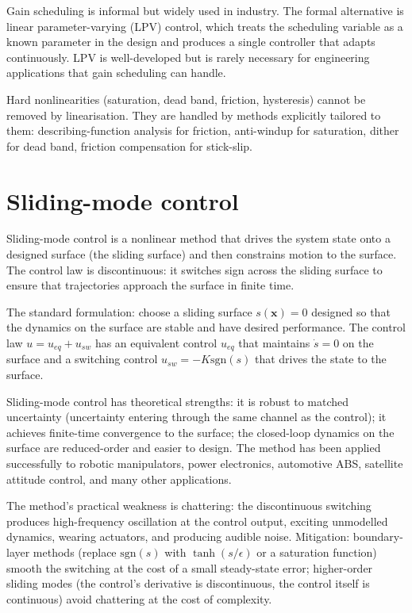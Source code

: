 Gain scheduling is informal but widely used in industry. The formal alternative is linear parameter-varying (LPV) control, which treats the scheduling variable as a known parameter in the design and produces a single controller that adapts continuously. LPV is well-developed but is rarely necessary for engineering applications that gain scheduling can handle.

Hard nonlinearities (saturation, dead band, friction, hysteresis) cannot be removed by linearisation. They are handled by methods explicitly tailored to them: describing-function analysis for friction, anti-windup for saturation, dither for dead band, friction compensation for stick-slip.

\section{Sliding-mode control}

Sliding-mode control is a nonlinear method that drives the system state onto a designed surface (the sliding surface) and then constrains motion to the surface. The control law is discontinuous: it switches sign across the sliding surface to ensure that trajectories approach the surface in finite time.

The standard formulation: choose a sliding surface $s(\mathbf{x}) = 0$ designed so that the dynamics on the surface are stable and have desired performance. The control law $u = u_{eq} + u_{sw}$ has an equivalent control $u_{eq}$ that maintains $\dot{s} = 0$ on the surface and a switching control $u_{sw} = -K \text{sgn}(s)$ that drives the state to the surface.

Sliding-mode control has theoretical strengths: it is robust to matched uncertainty (uncertainty entering through the same channel as the control); it achieves finite-time convergence to the surface; the closed-loop dynamics on the surface are reduced-order and easier to design. The method has been applied successfully to robotic manipulators, power electronics, automotive ABS, satellite attitude control, and many other applications.

The method's practical weakness is chattering: the discontinuous switching produces high-frequency oscillation at the control output, exciting unmodelled dynamics, wearing actuators, and producing audible noise. Mitigation: boundary-layer methods (replace $\text{sgn}(s)$ with $\tanh(s/\epsilon)$ or a saturation function) smooth the switching at the cost of a small steady-state error; higher-order sliding modes (the control's derivative is discontinuous, the control itself is continuous) avoid chattering at the cost of complexity.

